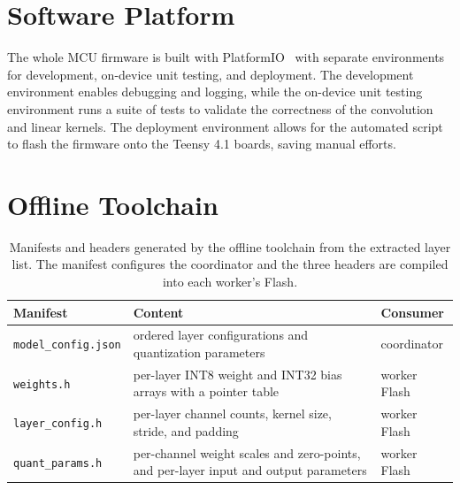 \section{Software Platform}
The whole MCU firmware is built with PlatformIO~\cite{platformio} with separate environments for development, on-device unit testing, and deployment. The development environment enables debugging and logging, while the on-device unit testing environment runs a suite of tests to validate the correctness of the convolution and linear kernels. The deployment environment allows for the automated script to flash the firmware onto the Teensy 4.1 boards, saving manual efforts. 



\section{Offline Toolchain}
\label{sec:implementation-offline-toolchain}
\begin{table}[h]
    \centering
    \caption{Manifests and headers generated by the offline toolchain from the extracted layer list. The manifest configures the coordinator and the three headers are compiled into each worker's Flash.}
    \begin{tabular}{ m{2.9cm}  m{6.4cm}  m{1.7cm} }
        \hline
        \textbf{Manifest} & \textbf{Content} & \textbf{Consumer} \\
        \hline
        \texttt{model\_config.json} & ordered layer configurations and quantization parameters & coordinator \\
        \hline
        \texttt{weights.h} &
        per-layer INT8 weight and INT32 bias arrays with a pointer table & worker Flash \\
        \hline
        \texttt{layer\_config.h} &
        per-layer channel counts, kernel size, stride, and padding & worker Flash \\
        \hline
        \texttt{quant\_params.h} &
        per-channel weight scales and zero-points, and per-layer input and output parameters & worker Flash \\
        \hline
    \end{tabular}
\label{tab:impl-manifests}
\end{table}


